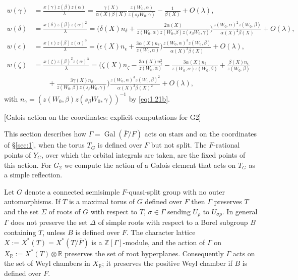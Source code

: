 \documentclass[12pt,letterpaper]{amsart}
\theoremstyle{plain}
\theoremstyle{definition}
\theoremstyle{remark}
\theoremstyle{definition}
\newcommand{\ovF}{\overline{F}}
\newcommand{\zzz}{\mathbb{Z}}
\newcommand{\rrr}{\mathbb{R}}
\DeclareMathOperator{\Gal}{Gal}
\begin{document}
\[
\begin{split}
w(\gamma)
&=\frac{x(\gamma)z(\beta)z(\alpha)}{\lambda}
=\frac{\gamma(X)}{\alpha(X)\beta(X)}\frac{z(W_0,\alpha)}{z(s_\beta W_0,\gamma)}
- \frac{1}{\beta(X)} + O(\lambda),\\
w(\delta)
&=\frac{x(\delta)z(\beta)z(\alpha)^2}{\lambda}
=\Big(\delta(X)n_\delta +
\frac{2\alpha(X)}{z(W_0,\alpha)z(W_0,\beta)z(s_\beta W_0,\gamma)}\Big)
\frac{z(W_0,\alpha)^2z(W_0,\beta)}{\alpha(X)^{2}\beta(X)}+O(\lambda),\\
w(\epsilon)
&=\frac{x(\epsilon)z(\beta)z(\alpha)^3}{\lambda}
=\Big(\epsilon(X)n_\epsilon + \frac{3\alpha(X)n_\delta}{z(W_0,\alpha)}\Big)
\frac{z(W_0,\alpha)^3z(W_0,\beta)}{\alpha(X)^{3}\beta(X)}+O(\lambda),\\
w(\zeta)
&=\frac{x(\zeta)z(\beta)^2z(\alpha)^3}{\lambda}
=\Big(\zeta(X)n_\zeta - \frac{3\alpha(X)n_\gamma^2}{z(W_0,\alpha)}
- \frac{3\alpha(X)n_\delta}{z(W_0,\alpha)z(W_0,\beta)}
+ \frac{\beta(X)n_\epsilon}{z(W_0,\beta)}\\
&\qquad + \frac{3\gamma(X)n_\delta}{z(W_0,\beta)z(s_\beta W_0,\gamma)}\Big)
\frac{z(W_0,\alpha)^3z(W_0,\beta)^2}{\alpha(X)^{3}\beta(X)^{2}}+O(\lambda),
\end{split}
\]
with $n_\gamma=(z(W_0,\beta)z(s_\beta W_0,\gamma))^{-1}$ by \eqref{eq:1.21b}.

[Galois action on the coordinates: explicit computations for G2]\label{sec:2}

This section describes how $\Gamma=\Gal(\ovF/F)$ acts on stars and on the
coordinates of \S\ref{sec:1}, when the torus $T_G$ is defined over $F$ but not
split. The $F$-rational points of $Y_C$, over which the orbital integrals are
taken, are the fixed points of this action. For $G_2$ we compute the action of
a Galois element that acts on $T_G$ as a simple reflection.

Let $G$ denote a connected semisimple $F$-quasi-split
group with no outer automorphisms.
If $T$ is a maximal torus of $G$ defined over $F$ then
$\Gamma$ preserves $T$ and the set $\Sigma$ of roots of $G$ with respect to
$T$, $\sigma\in \Gamma$ sending $U_\rho$ to $U_{\sigma\rho}$.
In general $\Gamma$ does not preserve the set $\Delta$ of simple roots with
respect to a Borel subgroup $B$ containing $T$, unless
$B$ is defined over $F$. The character lattice
$X:=X^*(T)=X^*(T/\overline{F})$ is a $\zzz[\Gamma]$-module, and the action
of $\Gamma$ on $X_{\rrr}:=X^*(T)\otimes \rrr$ preserves the
set of root hyperplanes. Consequently $\Gamma$ acts on the
set of Weyl chambers in $X_{\rrr}$; it preserves the positive
Weyl chamber if $B$ is defined over $F$.
\end{document}
